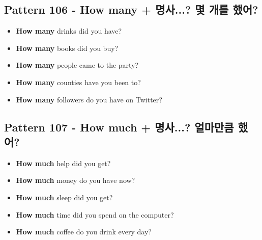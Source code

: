 \documentclass[11pt]{oblivoir}
\begin{document}
\subsection{Pattern 106 - How many + 명사...? 몇 개를 \texttildelow 했어?}
\begin{itemize}
  \item \textbf{How many} drinks did you have?
  \item \textbf{How many} books did you buy?
  \item \textbf{How many} people came to the party?
  \item \textbf{How many} counties have you been to?
  \item \textbf{How many} followers do you have on Twitter?
\end{itemize}

\subsection{Pattern 107 - How much + 명사...? 얼마만큼 \texttildelow 했어?}
\begin{itemize}
  \item \textbf{How much} help did you get?
  \item \textbf{How much} money do you have now?
  \item \textbf{How much} sleep did you get?
  \item \textbf{How much} time did you spend on the computer?
  \item \textbf{How much} coffee do you drink every day?
\end{itemize}
\end{document}
